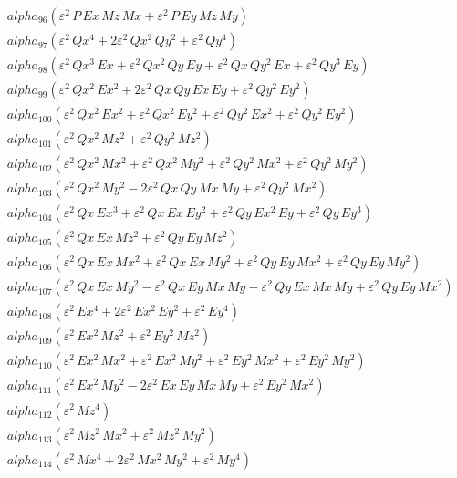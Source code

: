 \documentclass{article}
\begin{document}
\begin{align*}
  &\quad alpha_{96} \left(ε^{2}\,P\,Ex\,Mz\,Mx + ε^{2}\,P\,Ey\,Mz\,My\right) \\
  &\quad alpha_{97} \left(ε^{2}\,Qx^{4} + 2ε^{2}\,Qx^{2}\,Qy^{2} + ε^{2}\,Qy^{4}\right) \\
  &\quad alpha_{98} \left(ε^{2}\,Qx^{3}\,Ex + ε^{2}\,Qx^{2}\,Qy\,Ey + ε^{2}\,Qx\,Qy^{2}\,Ex + ε^{2}\,Qy^{3}\,Ey\right) \\
  &\quad alpha_{99} \left(ε^{2}\,Qx^{2}\,Ex^{2} + 2ε^{2}\,Qx\,Qy\,Ex\,Ey + ε^{2}\,Qy^{2}\,Ey^{2}\right) \\
  &\quad alpha_{100} \left(ε^{2}\,Qx^{2}\,Ex^{2} + ε^{2}\,Qx^{2}\,Ey^{2} + ε^{2}\,Qy^{2}\,Ex^{2} + ε^{2}\,Qy^{2}\,Ey^{2}\right) \\
  &\quad alpha_{101} \left(ε^{2}\,Qx^{2}\,Mz^{2} + ε^{2}\,Qy^{2}\,Mz^{2}\right) \\
  &\quad alpha_{102} \left(ε^{2}\,Qx^{2}\,Mx^{2} + ε^{2}\,Qx^{2}\,My^{2} + ε^{2}\,Qy^{2}\,Mx^{2} + ε^{2}\,Qy^{2}\,My^{2}\right) \\
  &\quad alpha_{103} \left(ε^{2}\,Qx^{2}\,My^{2} - 2ε^{2}\,Qx\,Qy\,Mx\,My + ε^{2}\,Qy^{2}\,Mx^{2}\right) \\
  &\quad alpha_{104} \left(ε^{2}\,Qx\,Ex^{3} + ε^{2}\,Qx\,Ex\,Ey^{2} + ε^{2}\,Qy\,Ex^{2}\,Ey + ε^{2}\,Qy\,Ey^{3}\right) \\
  &\quad alpha_{105} \left(ε^{2}\,Qx\,Ex\,Mz^{2} + ε^{2}\,Qy\,Ey\,Mz^{2}\right) \\
  &\quad alpha_{106} \left(ε^{2}\,Qx\,Ex\,Mx^{2} + ε^{2}\,Qx\,Ex\,My^{2} + ε^{2}\,Qy\,Ey\,Mx^{2} + ε^{2}\,Qy\,Ey\,My^{2}\right) \\
  &\quad alpha_{107} \left(ε^{2}\,Qx\,Ex\,My^{2} -ε^{2}\,Qx\,Ey\,Mx\,My -ε^{2}\,Qy\,Ex\,Mx\,My + ε^{2}\,Qy\,Ey\,Mx^{2}\right) \\
  &\quad alpha_{108} \left(ε^{2}\,Ex^{4} + 2ε^{2}\,Ex^{2}\,Ey^{2} + ε^{2}\,Ey^{4}\right) \\
  &\quad alpha_{109} \left(ε^{2}\,Ex^{2}\,Mz^{2} + ε^{2}\,Ey^{2}\,Mz^{2}\right) \\
  &\quad alpha_{110} \left(ε^{2}\,Ex^{2}\,Mx^{2} + ε^{2}\,Ex^{2}\,My^{2} + ε^{2}\,Ey^{2}\,Mx^{2} + ε^{2}\,Ey^{2}\,My^{2}\right) \\
  &\quad alpha_{111} \left(ε^{2}\,Ex^{2}\,My^{2} - 2ε^{2}\,Ex\,Ey\,Mx\,My + ε^{2}\,Ey^{2}\,Mx^{2}\right) \\
  &\quad alpha_{112} \left(ε^{2}\,Mz^{4}\right) \\
  &\quad alpha_{113} \left(ε^{2}\,Mz^{2}\,Mx^{2} + ε^{2}\,Mz^{2}\,My^{2}\right) \\
  &\quad alpha_{114} \left(ε^{2}\,Mx^{4} + 2ε^{2}\,Mx^{2}\,My^{2} + ε^{2}\,My^{4}\right) \\

\end{align*}
\end{document}
